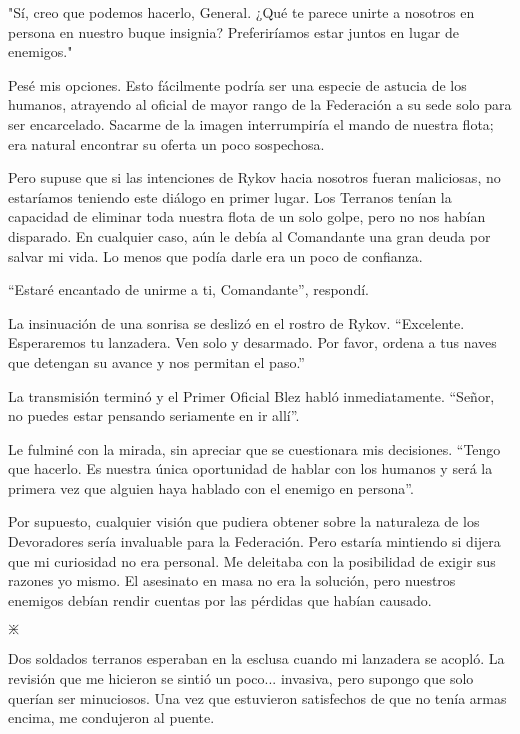 \documentclass[spanish,12pt,a4paper,oneside,titlepage]{book}
\begin{document}
    "Sí, creo que podemos hacerlo, General. ¿Qué te parece unirte a nosotros en persona en nuestro buque insignia? Preferiríamos estar juntos en lugar de enemigos."

    Pesé mis opciones. Esto fácilmente podría ser una especie de astucia de los humanos, atrayendo al oficial de mayor rango de la Federación a su sede solo para ser encarcelado. Sacarme de la imagen interrumpiría el mando de nuestra flota; era natural encontrar su oferta un poco sospechosa.

    Pero supuse que si las intenciones de Rykov hacia nosotros fueran maliciosas, no estaríamos teniendo este diálogo en primer lugar. Los Terranos tenían la capacidad de eliminar toda nuestra flota de un solo golpe, pero no nos habían disparado. En cualquier caso, aún le debía al Comandante una gran deuda por salvar mi vida. Lo menos que podía darle era un poco de confianza.

    “Estaré encantado de unirme a ti, Comandante”, respondí.

    La insinuación de una sonrisa se deslizó en el rostro de Rykov. “Excelente. Esperaremos tu lanzadera. Ven solo y desarmado. Por favor, ordena a tus naves que detengan su avance y nos permitan el paso.”

    La transmisión terminó y el Primer Oficial Blez habló inmediatamente. “Señor, no puedes estar pensando seriamente en ir allí”.

    Le fulminé con la mirada, sin apreciar que se cuestionara mis decisiones. “Tengo que hacerlo. Es nuestra única oportunidad de hablar con los humanos y será la primera vez que alguien haya hablado con el enemigo en persona”.

    Por supuesto, cualquier visión que pudiera obtener sobre la naturaleza de los Devoradores sería invaluable para la Federación. Pero estaría mintiendo si dijera que mi curiosidad no era personal. Me deleitaba con la posibilidad de exigir sus razones yo mismo. El asesinato en masa no era la solución, pero nuestros enemigos debían rendir cuentas por las pérdidas que habían causado.

    \begin{center} {\Huge $\divideontimes$} \end{center}

    Dos soldados terranos esperaban en la esclusa cuando mi lanzadera se acopló. La revisión que me hicieron se sintió un poco... invasiva, pero supongo que solo querían ser minuciosos. Una vez que estuvieron satisfechos de que no tenía armas encima, me condujeron al puente.
\end{document}
